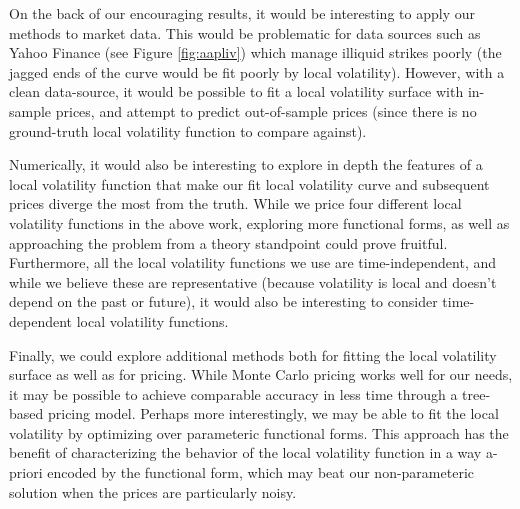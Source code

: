 \documentclass[11pt]{article}
\numberwithin{equation}{section}
\begin{document}
On the back of our encouraging results, it would be interesting to apply our
methods to market data. This would be problematic for data sources such as Yahoo
Finance (see Figure \ref{fig:aapliv}) which manage illiquid strikes poorly (the
jagged ends of the curve would be fit poorly by local volatility). However, with
a clean data-source, it would be possible to fit a local volatility surface with
in-sample prices, and attempt to predict out-of-sample prices (since there is no
ground-truth local volatility function to compare against).

Numerically, it would also be interesting to explore in depth the features of a
local volatility function that make our fit local volatility curve and
subsequent prices diverge the most from the truth. While we price four different
local volatility functions in the above work, exploring more functional forms,
as well as approaching the problem from a theory standpoint could prove
fruitful. Furthermore, all the local volatility functions we use are
time-independent, and while we believe these are representative (because
volatility is local and doesn't depend on the past or future), it would also be
interesting to consider time-dependent local volatility functions.

Finally, we could explore additional methods both for fitting the local
volatility surface as well as for pricing. While Monte Carlo pricing works well
for our needs, it may be possible to achieve comparable accuracy in less time
through a tree-based pricing model. Perhaps more interestingly, we may be able
to fit the local volatility by optimizing over parameteric functional forms.
This approach has the benefit of characterizing the behavior of the local
volatility function in a way a-priori encoded by the functional form, which may
beat our non-parameteric solution when the prices are particularly noisy.





\newpage

\appendix
\appendixpage





\end{document}
